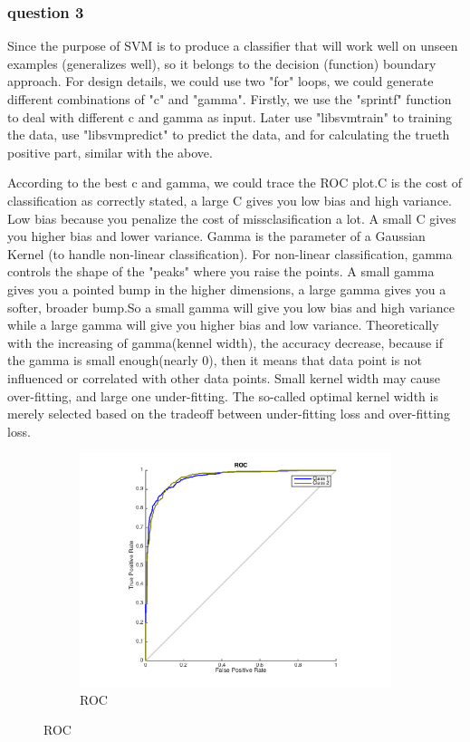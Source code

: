 \documentclass[]{article}
\begin{document}
\subsubsection{question 3}

Since the purpose of SVM is to produce a classifier that will work well on unseen examples (generalizes well), so it belongs to the decision (function) boundary approach. For design details, we could use two "for" loops, we could generate different combinations of "c" and "gamma". Firstly, we use the "sprintf" function to deal with different c and gamma as input. Later use "libsvmtrain" to training the data, use "libsvmpredict" to predict the data, and for calculating the trueth positive part, similar with the above.

According to the best c and gamma, we could trace the ROC plot.C is the cost of classification as correctly stated, a large C gives you low bias and high variance. Low bias because you penalize the cost of missclasification a lot. A small C gives you higher bias and lower variance. Gamma is the parameter of a Gaussian Kernel (to handle non-linear classification). For non-linear classification, gamma controls the shape of the "peaks" where you raise the points. A small gamma gives you a pointed bump in the higher dimensions, a large gamma gives you a softer, broader bump.So a small gamma will give you low bias and high variance while a large gamma will give you higher bias and low variance. Theoretically with the increasing of gamma(kennel width), the accuracy decrease, because if the gamma is small enough(nearly 0), then it means that data point is not influenced or correlated with other data points. Small kernel width may cause over-fitting, and large one under-fitting. The so-called optimal kernel width is merely selected based on the tradeoff between under-fitting loss and over-fitting loss. 


\begin{figure}[p]
	\centering
	\begin{subfigure}{.5\textwidth}
		\centering
		\includegraphics[width=1\linewidth]{../images-update/1-(3)-2.png}
		\caption{ROC}
		\label{fig:sub1}
	\end{subfigure}
		 
\end{figure}
\end{document}
